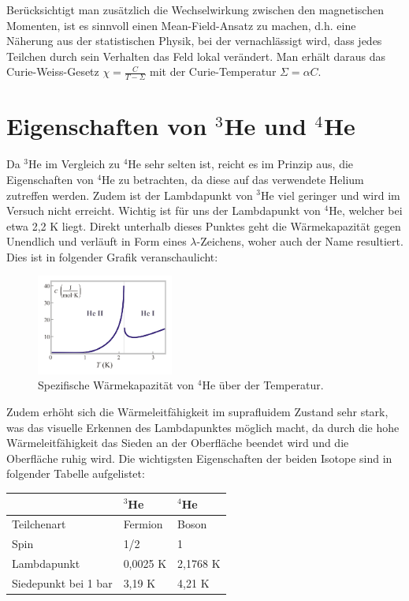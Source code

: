 \documentclass[bigchapter,colorback,accentcolor=tud4b,linedtoc,11pt]{tudreport}
\begin{document}
Berücksichtigt man zusätzlich die Wechselwirkung zwischen den magnetischen Momenten, ist es sinnvoll einen Mean-Field-Ansatz zu machen, d.h. eine Näherung aus der statistischen Physik, bei der vernachlässigt wird, dass jedes Teilchen durch sein Verhalten das Feld lokal verändert. Man erhält daraus das Curie-Weiss-Gesetz $\chi = \frac{C}{T- \Sigma}$ mit der Curie-Temperatur $\Sigma = \alpha C$.

\section{Eigenschaften von $^3$He und $^4$He}

Da $^3$He im Vergleich zu $^4$He sehr selten ist, reicht es im Prinzip aus, die Eigenschaften von $^4$He zu betrachten, da diese auf das verwendete Helium zutreffen werden. Zudem ist der Lambdapunkt von $^3$He viel geringer und wird im Versuch nicht erreicht. Wichtig ist für uns der Lambdapunkt von $^4$He, welcher bei etwa 2,2 K liegt. Direkt unterhalb dieses Punktes geht die Wärmekapazität gegen Unendlich und verläuft in Form eines $\lambda$-Zeichens, woher auch der Name resultiert. Dies ist in folgender Grafik veranschaulicht: 

\begin{figure}[h] 
  \centering
     \includegraphics[width=0.4\textwidth]{data/lambda.jpg}
  \caption{Spezifische Wärmekapazität von $^4$He über der Temperatur. \cite{wiki}}  
  \label{fig:Bild1}
\end{figure}

Zudem erhöht sich die Wärmeleitfähigkeit im suprafluidem Zustand sehr stark, was das visuelle Erkennen des Lambdapunktes möglich macht, da durch die hohe Wärmeleitfähigkeit das Sieden an der Oberfläche beendet wird und die Oberfläche ruhig wird. Die wichtigsten Eigenschaften der beiden Isotope sind in folgender Tabelle aufgelistet: 

\begin{center}
  \begin{tabular}{|p{5cm}|p{3cm}|p{3cm}|}
    \hline
    & $^3$He & $^4$He \\ \hline
    Teilchenart & Fermion & Boson  \\ \hline
    Spin & 1/2 & 1  \\ \hline
    Lambdapunkt & 0,0025 K & 2,1768 K  \\ \hline
    Siedepunkt bei 1 bar & 3,19 K & 4,21 K  \\ \hline
	\end{tabular}
\end{center}
\end{document}
